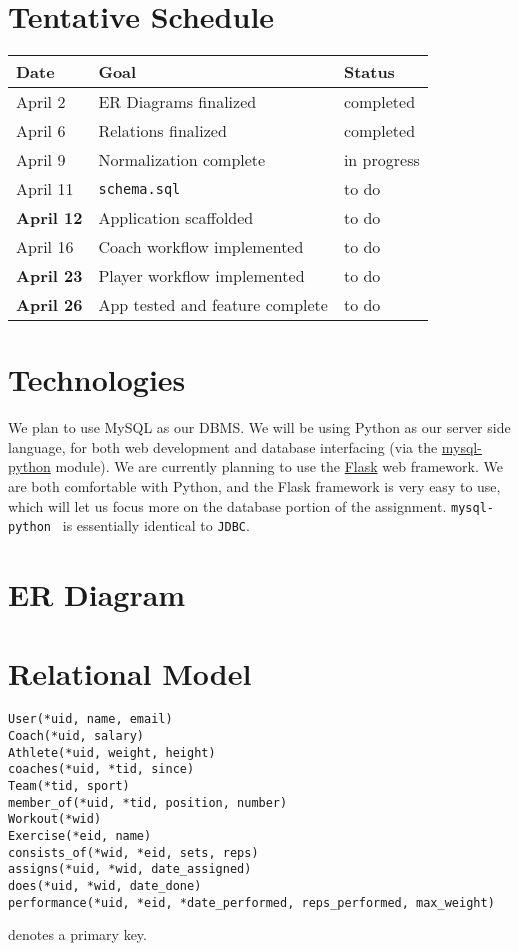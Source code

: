 \documentclass{article}
\begin{document}
    \section*{Tentative Schedule}
    \begin{tabular}{l || l | l}
        Date & Goal & Status \\
        \hline
        April 2 & ER Diagrams finalized & completed \\ 
        April 6 & Relations finalized & completed \\ 
        April 9 & Normalization complete & in progress \\ 
        April 11 & {\tt schema.sql} & to do \\ 
        \textbf{April 12} & Application scaffolded & to do \\ 
        April 16 & Coach workflow implemented & to do \\ 
        \textbf{April 23} & Player workflow implemented & to do \\ 
        \textbf{April 26} & App tested and feature complete & to do \\ 
    \end{tabular}

    \section*{Technologies}
    We plan to use MySQL as our DBMS. We will be using Python as our server side language,
    for both web development and database interfacing (via the 
    \href{http://mysql-python.sourceforge.net/MySQLdb.html}{mysql-python} module). 
    We are currently planning to use the \href{http://flask.pocoo.org/}{Flask} web framework.
    We are both comfortable with Python, and the Flask framework is very easy to use, which
    will let us focus more on the database portion of the assignment. {\tt mysql-python } is
    essentially identical to {\tt JDBC}.

    \section*{ER Diagram}
    

    \section*{Relational Model}
    \begin{verbatim}
User(*uid, name, email)
Coach(*uid, salary)
Athlete(*uid, weight, height)
coaches(*uid, *tid, since)
Team(*tid, sport)
member_of(*uid, *tid, position, number)
Workout(*wid)
Exercise(*eid, name)
consists_of(*wid, *eid, sets, reps)
assigns(*uid, *wid, date_assigned)
does(*uid, *wid, date_done)
performance(*uid, *eid, *date_performed, reps_performed, max_weight)
    \end{verbatim}
{\tt *} denotes a primary key.
\end{document}

